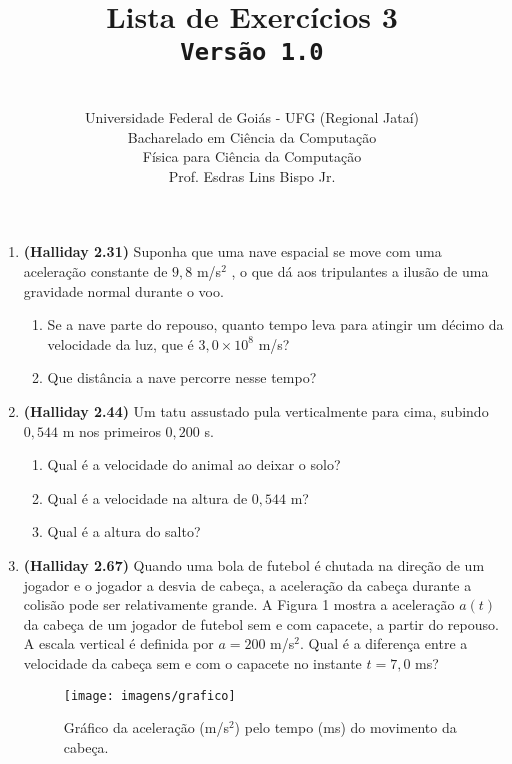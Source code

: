 \documentclass[12pt,a4paper,oneside]{article}
\author{\\Universidade Federal de Goiás - UFG (Regional Jataí) \\Bacharelado em Ciência da Computação \\Física para Ciência da Computação \\Prof. Esdras Lins Bispo Jr.}
\title{
	{\sc \huge Lista de Exercícios 3} 
	\\{\tt Versão 1.0}
}
\begin{document}
\maketitle

\begin{enumerate}

\section{Conceitos}
	
	\item {\bf (Halliday 2.31)} Suponha que uma nave espacial se move com uma aceleração constante de $9,8$ m/s$^2$ , o que dá aos tripulantes a ilusão de uma gravidade normal durante o voo. 
		\begin{enumerate}
			\item Se a nave parte do repouso, quanto
			tempo leva para atingir um décimo da velocidade da luz, que é $3,0 \times 10^8$  m/s?
			\item Que distância a nave percorre nesse tempo?
		\end{enumerate}
	
	\item {\bf (Halliday 2.44)} Um tatu assustado pula verticalmente para cima, subindo $0,544$ m nos primeiros $0,200$ s. 
		\begin{enumerate}
			\item Qual é a velocidade do animal ao deixar o solo?
			\item Qual é a velocidade na altura de $0,544$ m?
			\item Qual é a altura do salto?
		\end{enumerate}	
	
	\item {\bf (Halliday 2.67)} Quando uma bola de futebol é chutada na direção de um jogador e o jogador a desvia de cabeça, a aceleração da cabeça durante a colisão pode ser relativamente grande. A Figura 1 mostra a aceleração $a(t)$ da cabeça de um jogador de futebol sem e com capacete, a partir do repouso. A escala vertical é definida por $a =
	200$ m/s$^2$. Qual é a diferença entre a velocidade da cabeça sem e com o capacete no instante $t = 7,0$ ms?
		\begin{figure}
			\begin{center}
				\texttt{[image: imagens/grafico]}
			\end{center}
			\caption{Gráfico da aceleração (m/s$^2$) pelo tempo (ms) do movimento da cabeça.}
		\end{figure}
		


\end{enumerate}
\end{document}

